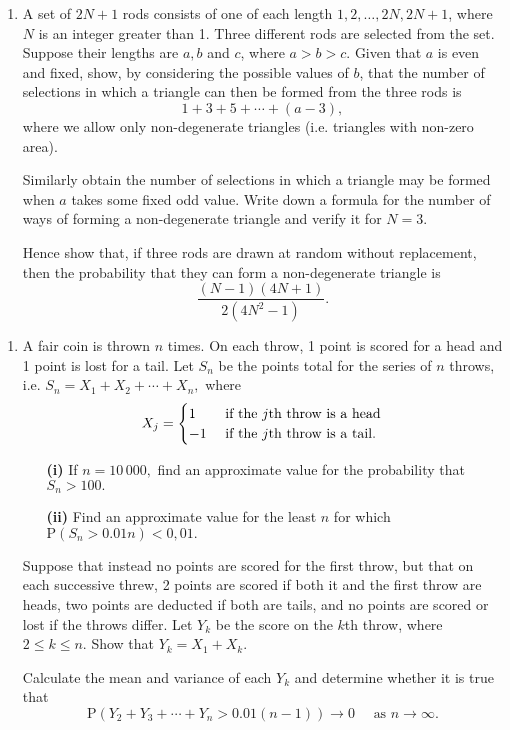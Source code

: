 \documentclass[a4, 11pt]{report}
\newlength{\qspace}
\newcounter{qnumber}
\newenvironment{question}%
 {\vspace{\qspace}
  \begin{enumerate}[\bfseries 1\quad][10]%
    \setcounter{enumi}{\value{qnumber}}%
    \item%
 }
{
  \end{enumerate}
  \filbreak
  \stepcounter{qnumber}
 }
\begin{document}
\begin{question}
A set of $2N+1$ rods consists of one of each length $1,2,\ldots,2N,2N+1$,
where $N$ is an integer greater than 1. Three different rods are
selected from the set. Suppose their lengths are $a,b$ and $c$,
where $a>b>c$. Given that $a$ is even and fixed, show, by considering
the possible values of $b$, that the number of selections in which
a triangle can then be formed from the three rods is 
\[
1+3+5+\cdots+(a-3),
\]
where we allow only non-degenerate triangles (i.e. triangles with
non-zero area). 


Similarly obtain the number of selections in which a triangle may
be formed when $a$ takes some fixed odd value. Write down a formula
for the number of ways of forming a non-degenerate triangle and verify
it for $N=3$. 


Hence show that, if three rods are drawn at random without replacement,
then the probability that they can form a non-degenerate triangle
is 
\[
\frac{(N-1)(4N+1)}{2(4N^{2}-1)}.
\]
\end{question}

\begin{question}
A fair coin is thrown $n$ times. On each throw, 1 point is scored
for a head and 1 point is lost for a tail. Let $S_{n}$ be the points
total for the series of $n$ throws, i.e. $S_{n}=X_{1}+X_{2}+\cdots+X_{n},$
where 
\[
X_{j}=\begin{cases}
1 & \mbox{ if the \ensuremath{j}th throw is a head}\\
-1 & \mbox{ if the \ensuremath{j}th throw is a tail.}
\end{cases}
\]


\begin{itemize}
\setlength{\itemsep}{3mm}
\item[\bf (i)]  If $n=10\,000,$ find an approximate value for the probability that
$S_{n}>100.$
\item[\bf (ii)] Find an approximate value for the least $n$ for which $\mathrm{P}(S_{n}>0.01n)<0,01.$ 
\end{itemize}

Suppose that instead no points are scored for the first throw, but
that on each successive threw, 2 points are scored if both it and
the first throw are heads, two points are deducted if both are tails,
and no points are scored or lost if the throws differ. Let $Y_{k}$
be the score on the $k$th throw, where $2\leqslant k\leqslant n.$
Show that $Y_{k}=X_{1}+X_{k}.$


Calculate the mean and variance of each $Y_{k}$ and determine whether
it is true that 
\[
\mathrm{P}(Y_{2}+Y_{3}+\cdots+Y_{n}>0.01(n-1))\rightarrow0\quad\mbox{ as }n\rightarrow\infty.
\]

\end{question}
\end{document}

